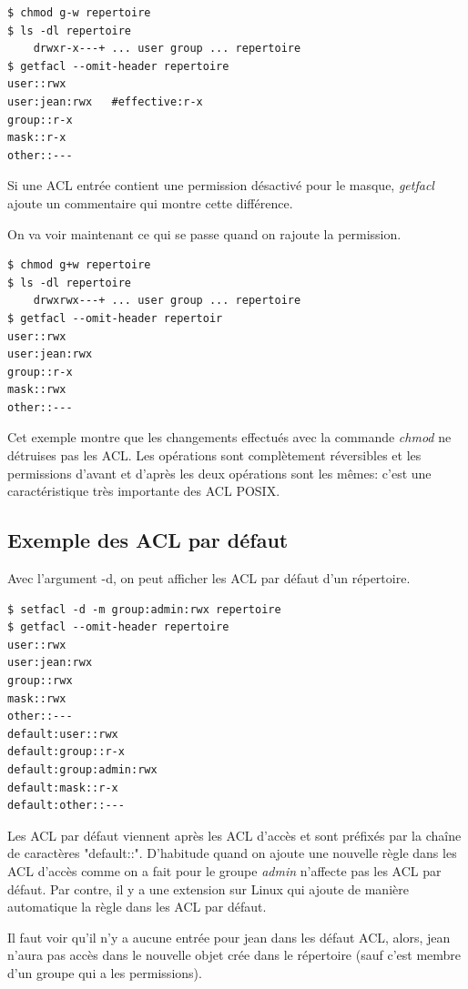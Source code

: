 \begin{verbatim}
$ chmod g-w repertoire 
$ ls -dl repertoire 
	drwxr-x---+ ... user group ... repertoire 
$ getfacl --omit-header repertoire 
user::rwx 
user:jean:rwx 	#effective:r-x
group::r-x 	
mask::r-x 
other::---

\end{verbatim}

Si une ACL entrée contient une permission désactivé pour le masque, \emph{getfacl} ajoute un commentaire qui montre cette différence.

On va voir maintenant ce qui se passe quand on rajoute la permission. 

\begin{verbatim}
$ chmod g+w repertoire 
$ ls -dl repertoire 
	drwxrwx---+ ... user group ... repertoire 
$ getfacl --omit-header repertoir 
user::rwx 
user:jean:rwx 
group::r-x
mask::rwx
other::---
\end{verbatim}

Cet exemple montre que les changements effectués avec la commande \emph{chmod} ne détruises pas les ACL. Les opérations sont complètement réversibles et les permissions d'avant et d'après les deux opérations sont les mêmes: c'est une caractéristique très importante des ACL POSIX. 

\subsection*{Exemple des ACL par défaut}

Avec l'argument -d, on peut afficher les ACL par défaut d'un répertoire. 

\begin{verbatim}
$ setfacl -d -m group:admin:rwx repertoire 
$ getfacl --omit-header repertoire 
user::rwx
user:jean:rwx
group::rwx 
mask::rwx
other::---
default:user::rwx
default:group::r-x
default:group:admin:rwx
default:mask::r-x
default:other::---
\end{verbatim} 

Les ACL par défaut viennent après les ACL d'accès et sont préfixés par la chaîne de caractères "default::". D'habitude quand on ajoute une nouvelle règle dans les ACL d'accès comme on a fait pour le groupe \emph{admin} n'affecte pas les ACL par défaut. Par contre, il y a une extension sur Linux qui ajoute de manière automatique la règle dans les ACL par défaut. 

Il faut voir qu'il n'y a aucune entrée pour jean dans les défaut ACL, alors, jean n'aura pas accès dans le nouvelle objet crée dans le répertoire (sauf c'est membre d'un groupe qui a les permissions). 

